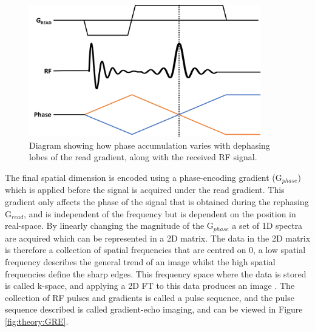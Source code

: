 \begin{figure}
    \centering
    \includegraphics[width=0.9\textwidth]{Figures/Theory/RePhasing.png}
    \caption{Diagram showing how phase accumulation varies with dephasing lobes of the read gradient, along with the received \ac{RF} signal.}
    \label{fig:enter-label}
\end{figure}

The final spatial dimension is encoded using a phase-encoding gradient (G$_{phase}$) which is applied before the signal is acquired under the read gradient. This gradient only affects the phase of the signal that is obtained during the rephasing G$_{read}$, and is independent of the frequency but is dependent on the position in real-space. By linearly changing the magnitude of the G$_{phase}$ a set of 1D spectra are acquired which can be represented in a 2D matrix. The data in the 2D matrix is therefore a collection of spatial frequencies that are centred on 0, a low spatial frequency describes the general trend of an image whilst the high spatial frequencies define the sharp edges. This frequency space where the data is stored is called k-space, and applying a 2D \ac{FT} to this data produces an image \cite{Lauterbur1973ImageResonance, Mansfield1977Multi-planarEchoes}. The collection of \ac{RF} pulses and gradients is called a pulse sequence, and the pulse sequence described is called gradient-echo imaging, and can be viewed in Figure \ref{fig:theory:GRE}.

